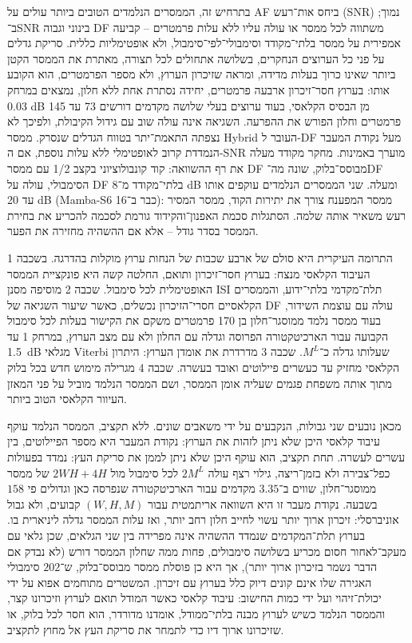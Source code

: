 \begin{otherlanguage}{hebrew}
\begin{justify}
\begin{flushright}
בתרחיש זה, הממסרים הנלמדים הטובים ביותר עולים על AF ביחס אות־רעש (SNR) נמוך; ב־SNR בינוני וגבוה DF משתווה לכל ממסר או עולה עליו ללא עלות פרמטרים -- קביעה אמפירית על ממסר בלתי־מקודד וסימבולי־לפי־סימבול, ולא אופטימליות כללית. סריקת גדלים על פני כל הערוצים הנחקרים, בשלושה אתחולים לכל תצורה, מאתרת את הממסר הקטן ביותר שאינו כרוך בעלות מדידה, ומראה שזיכרון הערוץ, ולא מספר הפרמטרים, הוא הקובע אותו: בערוץ חסר־זיכרון ארבעה פרמטרים, יחידה נסתרת אחת ללא חלון, נמצאים במרחק 0.03 dB מן הבסיס הקלאסי, בעוד ערוצים בעלי שלושה מקדמים דורשים 73 עד 145 פרמטרים וחלון הפורש את ההפרעה. השגיאה אינה עולה שוב עם גידול הקיבולת, ולפיכך לא נצפתה התאמת־יתר בטווח הגדלים שנסרק. ממסר Hybrid העובר ל-DF מעל נקודת המעבר הנמדדת קרוב לאופטימלי ללא עלות נוספת, אם ה-SNR מוערך באמינות. מחקר מקודד מעלה את רף ההשוואה: קוד קונבולוציוני בקצב 1/2 עם ממסר DF מבוסס־בלוק, שונה מה־DF הסימבולי, עולה על DF בלתי־מקודד מ־8 dB ומעלה. שני הממסרים הנלמדים עוקפים אותו עד 20 dB (Mamba-S6 כבר ב־16): ממסר המפענח צורך את יתירות הקוד, ממסר המסיר רעש משאיר אותה שלמה. הסתגלות סכמת האפנון־והקידוד גורמת לסכמה להכריע את בחירת הממסר בסדר גודל -- אלא אם ההשהיה מחזירה את הפער.

התרומה העיקרית היא סולם של ארבע שכבות של הנחות ערוץ מוקלות בהדרגה. בשכבה 1 העיבוד הקלאסי מנצח: בערוץ חסר־זיכרון ותואם, החלטה קשה היא פונקציית הממסר האופטימלית לכל סימבול. שכבה 2 מוסיפה מסנן ISI תלת־מקדמי בלתי־ידוע, והממסרים הקלאסיים חסרי־הזיכרון נכשלים, כאשר שיעור השגיאה של DF עולה עם עוצמת השידור, בעוד ממסר נלמד ממוסגר־חלון בן 170 פרמטרים משקם את הקישור בעלות לכל סימבול הקבועה עבור הארכיטקטורה הפרוסה וגדלה עם החלון ולא עם מצב הערוץ, במרחק 1 עד 1.5~dB מגלאי Viterbi שעלותו גדלה כ־$M^{L}$. שכבה 3 מדרדרת את אומדן הערוץ: היתרון הקלאסי מחזיק עד כעשרים פיילוטים ואובד בעשרה. שכבה 4 מגרילה מימוש חדש בכל בלוק מתוך אותה משפחת פגמים שעליה אומן הממסר, ושם הממסר הנלמד מוביל על פני המאזן העיוור הקלאסי הטוב ביותר.

מכאן נובעים שני גבולות, הנקבעים על ידי משאבים שונים. ללא תקציב, הממסר הנלמד עוקף עיבוד קלאסי היכן שלא ניתן לזהות את הערוץ: נקודת המעבר היא מספר הפיילוטים, בין עשרים לעשרה. תחת תקציב, הוא עוקף היכן שלא ניתן לממן את סריקת העץ: נמדד בפעולות כפל־צבירה ולא בזמן־ריצה, גילוי רצף עולה $2M^{L}$ לכל סימבול מול $2WH+4H$ של ממסר ממוסגר־חלון, שווים ב־$3.35$ מקדמים עבור הארכיטקטורה שנפרסה כאן וגדולים פי $158$ בשבעה. נקודת מעבר זו היא השוואה אריתמטית עבור $(W,H,M)$ קבועים, ולא גבול אוניברסלי: זיכרון ארוך יותר עשוי לחייב חלון רחב יותר, ואז עלות הממסר גדלה ליניארית בו. בערוץ תלת־המקדמים שנמדד ההשהיה אינה מפרידה בין שני הגלאים, שכן גלאי עם מעקב־לאחור חסום מכריע בשלושה סימבולים, פחות ממה שחלון הממסר דורש (לא נבדק אם הדבר נשמר בזיכרון ארוך יותר), אך היא כן פוסלת ממסר מבוסס־בלוק, ש־$202$ סימבולי האגירה שלו אינם קונים דיוק כלל בערוץ עם זיכרון. המשטרים מתוחמים אפוא על ידי יכולת־זיהוי ועל ידי כמות החישוב: עיבוד קלאסי כאשר המודל תואם לערוץ וזיכרונו קצר, והממסר הנלמד כשיש לערוץ מבנה בלתי־ממודל, אומדנו מדורדר, הוא חסר לכל בלוק, או שזיכרונו ארוך דיו כדי לתמחר את סריקת העץ אל מחוץ לתקציב.

\end{flushright}
\end{justify}
\end{otherlanguage}
